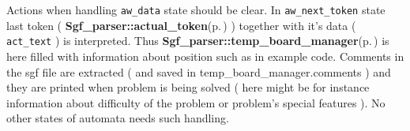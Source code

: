 Actions when handling {\tt aw\_\-data} state should be clear. In {\tt aw\_\-next\_\-token} state last token ( {\bf Sgf\_\-parser::actual\_\-token}{\rm (p.\,\pageref{classSgf__parser_r2})} ) together with it's data ( {\tt act\_\-text} ) is interpreted. Thus {\bf Sgf\_\-parser::temp\_\-board\_\-manager}{\rm (p.\,\pageref{classSgf__parser_r12})} is here filled with information about position such as in example code. Comments in the sgf file are extracted ( and saved in temp\_\-board\_\-manager.comments ) and they are printed when problem is being solved ( here might be for instance information about difficulty of the problem or problem's special features ). No other states of automata needs such handling. 